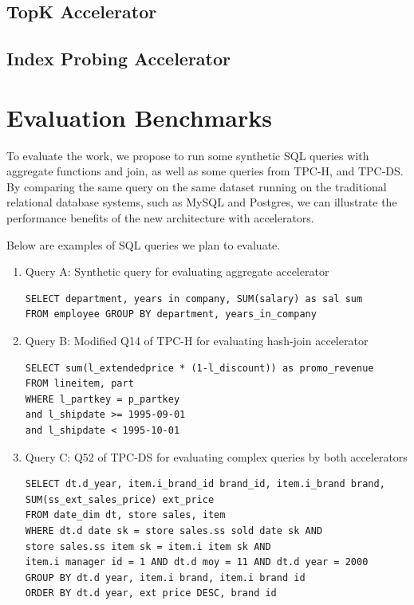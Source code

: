 \documentclass{article}
\begin{document}
\subsection{TopK Accelerator}

\subsection{Index Probing Accelerator}



\section{Evaluation Benchmarks}
\label{sec:eval}
To evaluate the work, we propose to run some synthetic SQL queries with aggregate functions and join, as well as some queries from TPC-H, and TPC-DS.
By comparing the same query on the same dataset running on the traditional relational database systems, such as MySQL and Postgres, we can illustrate the performance benefits of the new architecture with accelerators.

Below are examples of SQL queries we plan to evaluate.

\begin{enumerate}

\item Query A: Synthetic query for evaluating aggregate accelerator 
\begin{verbatim}
SELECT department, years in company, SUM(salary) as sal sum
FROM employee GROUP BY department, years_in_company
\end{verbatim}

\item Query B: Modified Q14 of TPC-H for evaluating hash-join accelerator
\begin{verbatim}
SELECT sum(l_extendedprice * (1-l_discount)) as promo_revenue
FROM lineitem, part
WHERE l_partkey = p_partkey
and l_shipdate >= 1995-09-01 
and l_shipdate < 1995-10-01
\end{verbatim}

\item Query C: Q52 of TPC-DS for evaluating complex queries by both accelerators
\begin{verbatim}
SELECT dt.d_year, item.i_brand_id brand_id, item.i_brand brand,
SUM(ss_ext_sales_price) ext_price
FROM date_dim dt, store sales, item
WHERE dt.d date sk = store sales.ss sold date sk AND
store sales.ss item sk = item.i item sk AND
item.i manager id = 1 AND dt.d moy = 11 AND dt.d year = 2000
GROUP BY dt.d year, item.i brand, item.i brand id
ORDER BY dt.d year, ext price DESC, brand id
\end{verbatim}
\end{enumerate}
\end{document}
